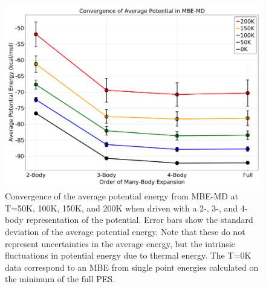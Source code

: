\documentclass[11pt, proquest]{uwthesis}[2020/02/24]
\begin{document}
\begin{figure}[t]
\uwsinglespace
\begin{center}
\begin{minipage}{0.9\textwidth}
\includegraphics[width=\textwidth]{Figures/Chapter_4/ch4_figure_3.png}
\end{minipage}
\end{center}
\caption[Convergence of the average potential energy from MBE-MD at T=50K, 100K, 150K, and 200K when driven with a 2-, 3-, and 4-body representation of the potential. Error bars show the standard deviation of the average potential energy. Note that these do not represent uncertainties in the average energy, but the intrinsic fluctuations in potential energy due to thermal energy. The T=0K data correspond to an MBE from single point energies calculated on the minimum of the full PES.]{Convergence of the average potential energy from MBE-MD at T=50K, 100K, 150K, and 200K when driven with a 2-, 3-, and 4-body representation of the potential. Error bars show the standard deviation of the average potential energy. Note that these do not represent uncertainties in the average energy, but the intrinsic fluctuations in potential energy due to thermal energy. The T=0K data correspond to an MBE from single point energies calculated on the minimum of the full PES.}
\label{fig:MBE_MD_F3}
\end{figure}
\end{document}
